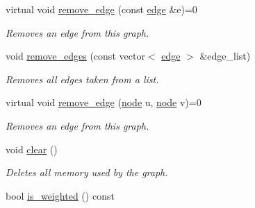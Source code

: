 \begin{DoxyCompactItemize}
virtual void \hyperlink{classlgraph_1_1utils_1_1wxgraph_a5149c486108dfa06ee99c5ac09e46700}{remove\+\_\+edge} (const \hyperlink{namespacelgraph_1_1utils_a6510284ce1b1ae5dc97ce5d2de426e10}{edge} \&e)=0
\begin{DoxyCompactList}\small\item\em Removes an edge from this graph. \end{DoxyCompactList}\item 
void \hyperlink{classlgraph_1_1utils_1_1wxgraph_a4188b82f50e962b28c2c076b7978a854}{remove\+\_\+edges} (const vector$<$ \hyperlink{namespacelgraph_1_1utils_a6510284ce1b1ae5dc97ce5d2de426e10}{edge} $>$ \&edge\+\_\+list)
\begin{DoxyCompactList}\small\item\em Removes all edges taken from a list. \end{DoxyCompactList}\item 
virtual void \hyperlink{classlgraph_1_1utils_1_1wxgraph_aa5bf6c53cc0097621e7df44c32a0e2fc}{remove\+\_\+edge} (\hyperlink{namespacelgraph_1_1utils_a7bd66ede3805ef121bc2835bd48de0cf}{node} u, \hyperlink{namespacelgraph_1_1utils_a7bd66ede3805ef121bc2835bd48de0cf}{node} v)=0
\begin{DoxyCompactList}\small\item\em Removes an edge from this graph. \end{DoxyCompactList}\item 
void \hyperlink{classlgraph_1_1utils_1_1wxgraph_a421bc8166e35335445e45efc680ebe3f}{clear} ()
\begin{DoxyCompactList}\small\item\em Deletes all memory used by the graph. \end{DoxyCompactList}\item 
bool \hyperlink{classlgraph_1_1utils_1_1wxgraph_adda596cfbf72080d46ab445679fe092f}{is\+\_\+weighted} () const \hypertarget{classlgraph_1_1utils_1_1wxgraph_adda596cfbf72080d46ab445679fe092f}{}\label{classlgraph_1_1utils_1_1wxgraph_adda596cfbf72080d46ab445679fe092f}


\end{DoxyCompactItemize}
